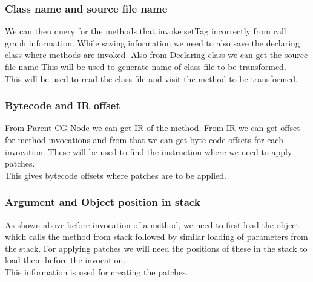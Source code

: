 \documentclass[11pt,psfig,a4]{article}
\begin{document}
\begin{flushleft}
\subsubsection{Class name and source file name}
We can then query for the methods that invoke setTag incorrectly from call graph information. While saving information we need to also save the declaring class where methods are invoked. Also from Declaring class we can get the source file name This will be used to generate name of class file to be transformed.\\
This will be used to read the class file and visit the method to be transformed.\\
\subsubsection{Bytecode and IR offset}
From Parent CG Node we can get IR of the method. From IR we can get offset for method invocations and from that we can get byte code offsets for each invocation. These will be used to find the instruction where we need to apply patches.\\
This gives bytecode offsets where patches are to be applied.\\
\subsubsection{Argument and Object position in stack}
As shown above before invocation of a method, we need to first load the object which calls the method from stack followed by similar loading of parameters from the stack. For applying patches we will need the positions of these in the stack to load them before the invocation.\\
This information is used for creating the patches.\\
\end{flushleft}
\end{document}
